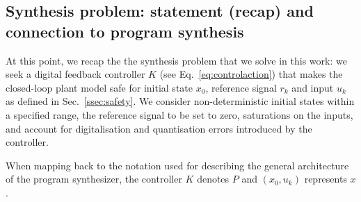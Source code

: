 \documentclass[runningheads,a4paper]{llncs}
\begin{document}
\subsection{Synthesis problem: statement (recap) and connection to program synthesis}


At this point, we recap the the synthesis problem that we solve in this work:
we seek a digital feedback controller $K$ (see Eq.~\ref{eq:controlaction})
that makes the closed-loop plant model safe for 
initial state $x_0$, reference signal $r_k$ and input $u_k$
as defined in Sec.~\ref{ssec:safety}. 
We consider non-deterministic initial states within a specified range, 
the reference signal to be set to zero, 
saturations on the inputs, 
and account for digitalisation and quantisation errors introduced by the controller.  

When mapping back to the notation used for describing the general architecture of the program synthesizer, 
the controller $K$ denotes $P$ and $(x_0, u_k)$ represents $x$. 


\end{document}
